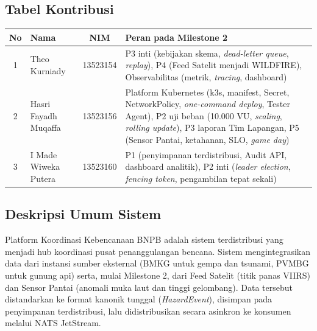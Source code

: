 
\subsection{Tabel Kontribusi}

\begin{center}
\begin{tabularx}{\linewidth}{|c|p{4.2cm}|c|X|}
\hline
\textbf{No} & \textbf{Nama} & \textbf{NIM} & \textbf{Peran pada Milestone 2}\\ \hline
1 & Theo Kurniady & 13523154 & P3 inti (kebijakan skema, \textit{dead-letter queue}, \textit{replay}), P4 (Feed Satelit menjadi WILDFIRE), Observabilitas (metrik, \textit{tracing}, dashboard)\\ \hline
2 & Hasri Fayadh Muqaffa & 13523156 & Platform Kubernetes (k3s, manifest, Secret, NetworkPolicy, \textit{one-command deploy}, Tester Agent), P2 uji beban (10.000 VU, \textit{scaling}, \textit{rolling update}), P3 laporan Tim Lapangan, P5 (Sensor Pantai, ketahanan, SLO, \textit{game day})\\ \hline
3 & I Made Wiweka Putera & 13523160 & P1 (penyimpanan terdistribusi, Audit API, dashboard analitik), P2 inti (\textit{leader election}, \textit{fencing token}, pengambilan tepat sekali)\\ \hline
\end{tabularx}
\end{center}

\subsection{Deskripsi Umum Sistem}

Platform Koordinasi Kebencanaan BNPB adalah sistem terdistribusi yang menjadi hub koordinasi pusat penanggulangan bencana. Sistem mengintegrasikan data dari instansi sumber eksternal (BMKG untuk gempa dan tsunami, PVMBG untuk gunung api) serta, mulai Milestone 2, dari Feed Satelit (titik panas VIIRS) dan Sensor Pantai (anomali muka laut dan tinggi gelombang). Data tersebut distandarkan ke format kanonik tunggal (\textit{HazardEvent}), disimpan pada penyimpanan terdistribusi, lalu didistribusikan secara asinkron ke konsumen melalui NATS JetStream.

